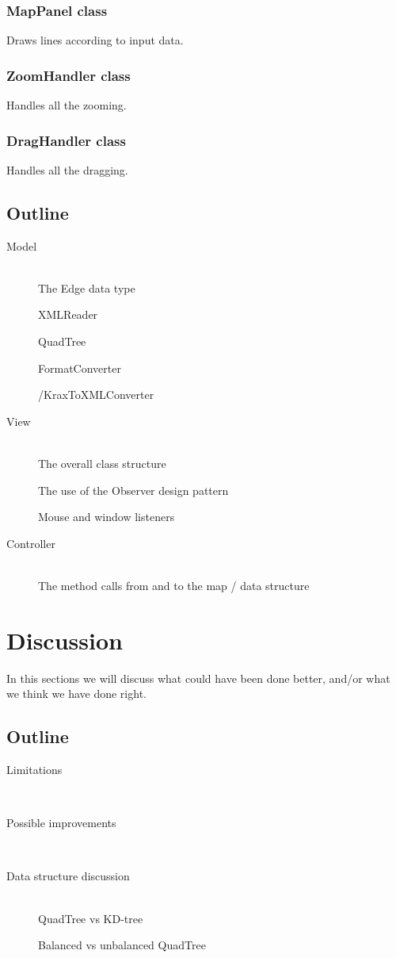 \documentclass[a4paper,11pt]{article}
\begin{document}
\subsubsection{MapPanel class} %
Draws lines according to input data.

\subsubsection{ZoomHandler class} %
Handles all the zooming.

\subsubsection{DragHandler class} %
Handles all the dragging.

\subsection{Outline}
\begin{description}
	\item[Model] \hfill \\
	The Edge data type
	
	XMLReader
	
	QuadTree
	
	FormatConverter
	
	/KraxToXMLConverter
	\item[View] \hfill \\
	The overall class structure
	
	The use of the Observer design pattern
	
	Mouse and window listeners
	\item[Controller] \hfill \\
	The method calls from and to the map / data structure
\end{description}

\pagebreak
\section{Discussion} %
\label{sec:Discussion}
In this sections we will discuss what could have been done better, and/or what we think we have done right.

\subsection{Outline}
\begin{description}
	\item[Limitations] \hfill \\
	
	\item[Possible improvements] \hfill \\
	
	\item[Data structure discussion] \hfill \\
	QuadTree vs KD-tree
	
	Balanced vs unbalanced QuadTree
\end{description}
\end{document}
